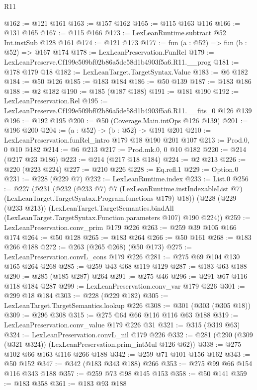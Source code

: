 \begin{lexlean}{R11}
\begin{coremodule}
@162 := @121 @161
@163 := @157 @162
@165 := @115 @163 @116
@166 := @131 @165
@167 := @115 @166
@173 := LexLeanRuntime.subtract @52 Int.instSub @128 @161
@174 := @121 @173
@177 := fun (a : @52) => fun (b : @52) => @167 @174
@178 := LexLeanPreservation.FunRel
@179 := LexLeanPreserve.Cf199e509bf02b86a5de58d1b4903f5a6.R11.__prog
@181 := @178 @179 @18
@182 := LexLeanTarget.TargetSyntax.Value
@183 := @6 @182
@184 := @50 @126
@185 := @183 @184
@186 := @50 @139
@187 := @183 @186
@188 := @2 @182
@190 := @185 (@187 @188)
@191 := @181 @190
@192 := LexLeanPreservation.Rel
@195 := LexLeanPreserve.Cf199e509bf02b86a5de58d1b4903f5a6.R11.__fits_0 @126 @139
@196 := @192 @195
@200 := @50 (Coverage.Main.intOps @126 @139)
@201 := @196 @200
@204 := (a : @52) -> (b : @52) -> @191 @201
@210 := LexLeanPreservation.funRel_intro @179 @18 @190 @201 @107
@213 := Prod.{0, 0} @10 @182
@214 := @6 @213
@217 := Prod.mk.{0, 0} @10 @182
@220 := @214 (@217 @23 @186)
@223 := @214 (@217 @18 @184)
@224 := @2 @213
@226 := @220 (@223 @224)
@227 := @210 @226
@228 := Eq.refl.{1}
@229 := Option.{0}
@231 := @228 (@229 @7)
@232 := LexLeanRuntime.index
@233 := List.{0}
@256 := @227
    (@231
      (@232
        (@233 @7)
        @7
        (LexLeanRuntime.instIndexableList @7)
        (LexLeanTarget.TargetSyntax.Program.functions @179)
        @18))
    (@228
      (@229 (@233 @213))
      (LexLeanTarget.TargetSemantics.bindAll
        (LexLeanTarget.TargetSyntax.Function.parameters @107)
        @190
        @224))
@259 := LexLeanPreservation.conv_prim @179 @226
@263 := @259 @39 @105 @166 @174
@264 := @50 @128
@265 := @183 @264
@266 := @50 @161
@268 := @183 @266 @188
@272 := @263 (@265 @268) (@50 @173)
@275 := LexLeanPreservation.convL_cons @179 @226
@281 := @275 @69 @104 @130 @165 @264 @268
@285 := @259 @43 @68 @119 @129
@287 := @183 @63 @188
@290 := @285 (@185 @287) @264
@291 := @275 @46
@296 := @291 @67 @116 @118 @184 @287
@299 := LexLeanPreservation.conv_var @179 @226
@301 := @299 @18 @184
@303 := @228 (@229 @182)
@305 := LexLeanTarget.TargetSemantics.lookup @226
@308 := @301 (@303 (@305 @18))
@309 := @296 @308
@315 := @275 @64 @66 @116 @116 @63 @188
@319 := LexLeanPreservation.conv_value @179 @226 @31
@321 := @315 (@319 @63)
@324 := LexLeanPreservation.convL_nil @179 @226
@332 := @281 (@290 (@309 (@321 @324)) (LexLeanPreservation.prim_intMul @126 @62))
@338 := @275 @102 @66 @163 @116 @266 @188
@342 := @259 @71 @101 @156 @162
@343 := @50 @152
@347 := @342 (@183 @343 @188) @266
@353 := @275 @99 @66 @154 @116 @343 @188
@357 := @259 @73 @98 @145 @153
@358 := @50 @141
@359 := @183 @358
@361 := @183 @93 @188

\end{coremodule}
\end{lexlean}
